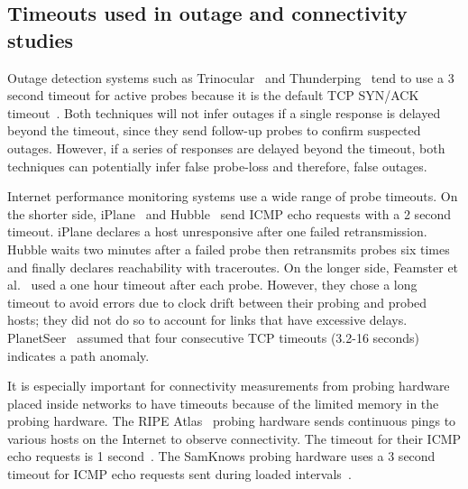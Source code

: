 
\subsection{Timeouts used in outage and connectivity studies}

Outage detection systems such as Trinocular~\cite{trinocular}
and Thunderping~\cite{pingin} tend to use a 3 second timeout for active
probes because it is the default TCP SYN/ACK
timeout~\cite{rfc1122}. Both techniques will not infer outages if a
single response is delayed beyond the timeout, since they send
follow-up probes to confirm suspected outages. However, if a series of
responses are delayed beyond the timeout, both techniques can
potentially infer false probe-loss and therefore, false
outages. %

Internet performance monitoring systems use a wide range of probe
timeouts. On the shorter side, iPlane~\cite{iplane} and
Hubble~\cite{hubble} send ICMP echo requests with a 2 second
timeout. iPlane declares a host unresponsive after one failed
retransmission. Hubble waits two minutes after a failed probe then
retransmits probes six times and finally declares reachability with
traceroutes. On the longer side, Feamster et
al.~\cite{measuring-effects} used a one hour timeout after each
probe. However, they chose a long timeout to avoid errors due to clock
drift between their probing and probed hosts; they did not do so to
account for links that have excessive
delays. PlanetSeer~\cite{planetseer} assumed that four consecutive TCP
timeouts (3.2-16 seconds) indicates a path anomaly.

It is especially important for connectivity measurements from probing
hardware placed inside networks to have timeouts because of the limited memory
in the probing hardware. The RIPE Atlas~\cite{atlas} probing hardware sends
continuous pings to various hosts on the Internet to observe connectivity. The
timeout for their ICMP echo requests is 1
second~\cite{atlas-mailing-list-post}. 
The SamKnows probing hardware uses a 3 second timeout for ICMP echo requests
sent during loaded intervals~\cite{samknows}.

